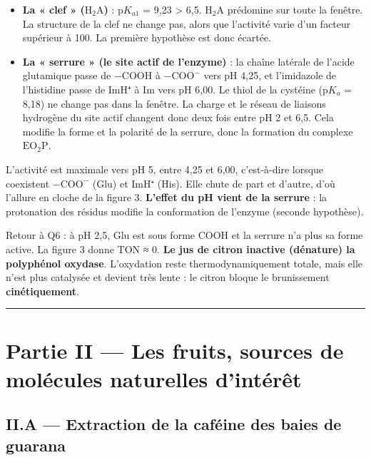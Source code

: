 \documentclass[11pt,a4paper]{article}
\providecommand{\tightlist}{\setlength{\itemsep}{0pt}\setlength{\parskip}{0pt}}
\begin{document}
\begin{itemize}
\tightlist
\item
  \textbf{La « clef » (\(\mathrm{H_2A}\))} : p\(K_{a1}\) = 9,23 \textgreater{} 6,5. \(\mathrm{H_2A}\) prédomine sur toute la fenêtre. La structure de la clef ne change pas, alors que l'activité varie d'un facteur supérieur à 100. La première hypothèse est donc écartée.
\item
  \textbf{La « serrure » (le site actif de l'enzyme)} : la chaîne latérale de l'acide glutamique passe de \(-\mathrm{COOH}\) à \(-\mathrm{COO^-}\) vers pH 4,25, et l'imidazole de l'histidine passe de ImH⁺ à Im vers pH 6,00. Le thiol de la cystéine (p\(K_a\) = 8,18) ne change pas dans la fenêtre. La charge et le réseau de liaisons hydrogène du site actif changent donc deux fois entre pH 2 et 6,5. Cela modifie la forme et la polarité de la serrure, donc la formation du complexe \(\mathrm{EO_2P}\).
\end{itemize}

L'activité est maximale vers pH 5, entre 4,25 et 6,00, c'est-à-dire lorsque coexistent \(-\mathrm{COO^-}\) (Glu) et ImH⁺ (His). Elle chute de part et d'autre, d'où l'allure en cloche de la figure 3. \textbf{L'effet du pH vient de la serrure} : la protonation des résidus modifie la conformation de l'enzyme (seconde hypothèse).

Retour à Q6 : à pH 2,5, Glu est sous forme COOH et la serrure n'a plus sa forme active. La figure 3 donne TON ≈ 0. \textbf{Le jus de citron inactive (dénature) la polyphénol oxydase}. L'oxydation reste thermodynamiquement totale, mais elle n'est plus catalysée et devient très lente : le citron bloque le brunissement \textbf{cinétiquement}.

\begin{center}\rule{0.5\linewidth}{0.5pt}\end{center}

\hypertarget{partie-ii-les-fruits-sources-de-moluxe9cules-naturelles-dintuxe9ruxeat}{%
\section{Partie II --- Les fruits, sources de molécules naturelles d'intérêt}\label{partie-ii-les-fruits-sources-de-moluxe9cules-naturelles-dintuxe9ruxeat}}

\hypertarget{ii.a-extraction-de-la-cafuxe9ine-des-baies-de-guarana}{%
\subsection{II.A --- Extraction de la caféine des baies de guarana}\label{ii.a-extraction-de-la-cafuxe9ine-des-baies-de-guarana}}
\end{document}
